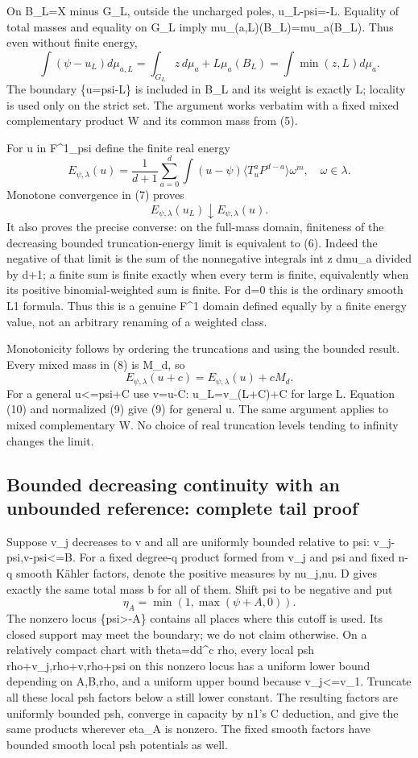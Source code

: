 \documentclass[
]{article}
\begin{document}
On B\_L=X minus G\_L, outside the uncharged poles, u\_L-psi=-L. Equality
of total masses and equality on G\_L imply mu\_(a,L)(B\_L)=mu\_a(B\_L).
Thus even without finite energy, \[
\int(\psi-u_L)d\mu_{a,L}
=\int_{G_L}z\,d\mu_a+L\mu_a(B_L)
=\int\min(z,L)d\mu_a.\tag{7}
\] The boundary \{u=psi-L\} is included in B\_L and its weight is
exactly L; locality is used only on the strict set. The argument works
verbatim with a fixed mixed complementary product W and its common mass
from (5).

For u in F\^{}1\_psi define the finite real energy \[
E_{\psi,\lambda}(u)=\frac1{d+1}\sum_{a=0}^d
\int(u-\psi)\langle T_u^aP^{d-a}\rangle\omega^m,\quad\omega\in\lambda.\tag{8}
\] Monotone convergence in (7) proves \[
E_{\psi,\lambda}(u_L)\downarrow E_{\psi,\lambda}(u).\tag{9}
\] It also proves the precise converse: on the full-mass domain,
finiteness of the decreasing bounded truncation-energy limit is
equivalent to (6). Indeed the negative of that limit is the sum of the
nonnegative integrals int z dmu\_a divided by d+1; a finite sum is
finite exactly when every term is finite, equivalently when its positive
binomial-weighted sum is finite. For d=0 this is the ordinary smooth L1
formula. Thus this is a genuine F\^{}1 domain defined equally by a
finite energy value, not an arbitrary renaming of a weighted class.

Monotonicity follows by ordering the truncations and using the bounded
result. Every mixed mass in (8) is M\_d, so \[
E_{\psi,\lambda}(u+c)=E_{\psi,\lambda}(u)+cM_d.\tag{10}
\] For a general u\textless=psi+C use v=u-C: u\_L=v\_(L+C)+C for large
L. Equation (10) and normalized (9) give (9) for general u. The same
argument applies to mixed complementary W. No choice of real truncation
levels tending to infinity changes the limit.

\subsection{Bounded decreasing continuity with an unbounded reference:
complete tail
proof}\label{bounded-decreasing-continuity-with-an-unbounded-reference-complete-tail-proof}

Suppose v\_j decreases to v and all are uniformly bounded relative to
psi: \textbar v\_j-psi\textbar,\textbar v-psi\textbar\textless=B. For a
fixed degree-q product formed from v\_j and psi and fixed n-q smooth
Kähler factors, denote the positive measures by nu\_j,nu. D gives
exactly the same total mass b for all of them. Shift psi to be negative
and put \[
\eta_A=\min(1,\max(\psi+A,0)).
\] The nonzero locus \{psi\textgreater-A\} contains all places where
this cutoff is used. Its closed support may meet the boundary; we do not
claim otherwise. On a relatively compact chart with theta=dd\^{}c rho,
every local psh rho+v\_j,rho+v,rho+psi on this nonzero locus has a
uniform lower bound depending on A,B,rho, and a uniform upper bound
because v\_j\textless=v\_1. Truncate all these local psh factors below a
still lower constant. The resulting factors are uniformly bounded psh,
converge in capacity by n1's C deduction, and give the same products
wherever eta\_A is nonzero. The fixed smooth factors have bounded smooth
local psh potentials as well.
\end{document}
